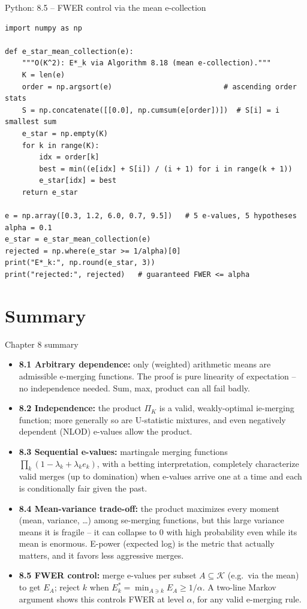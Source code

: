 \documentclass[aspectratio=169,10pt]{beamer}
\newcommand{\calK}{\mathcal{K}}
\begin{document}
\begin{frame}[fragile]{Python: 8.5 -- FWER control via the mean e-collection}
  \begin{lstlisting}
import numpy as np

def e_star_mean_collection(e):
    """O(K^2): E*_k via Algorithm 8.18 (mean e-collection)."""
    K = len(e)
    order = np.argsort(e)                          # ascending order stats
    S = np.concatenate([[0.0], np.cumsum(e[order])])  # S[i] = i smallest sum
    e_star = np.empty(K)
    for k in range(K):
        idx = order[k]
        best = min((e[idx] + S[i]) / (i + 1) for i in range(k + 1))
        e_star[idx] = best
    return e_star

e = np.array([0.3, 1.2, 6.0, 0.7, 9.5])   # 5 e-values, 5 hypotheses
alpha = 0.1
e_star = e_star_mean_collection(e)
rejected = np.where(e_star >= 1/alpha)[0]
print("E*_k:", np.round(e_star, 3))
print("rejected:", rejected)   # guaranteed FWER <= alpha
  \end{lstlisting}
\end{frame}

\section{Summary}

\begin{frame}{Chapter 8 summary}
  \begin{itemize}
    \item \textbf{8.1 Arbitrary dependence:} only (weighted) arithmetic means are admissible e-merging functions. The proof is pure linearity of expectation -- no independence needed. Sum, max, product can all fail badly.
    \item \textbf{8.2 Independence:} the product $\Pi_K$ is a valid, weakly-optimal ie-merging function; more generally so are U-statistic mixtures, and even negatively dependent (NLOD) e-values allow the product.
    \item \textbf{8.3 Sequential e-values:} martingale merging functions $\prod_k(1-\lambda_k+\lambda_k e_k)$, with a betting interpretation, completely characterize valid merges (up to domination) when e-values arrive one at a time and each is conditionally fair given the past.
    \item \textbf{8.4 Mean-variance trade-off:} the product maximizes every moment (mean, variance, \dots) among se-merging functions, but this large variance means it is fragile -- it can collapse to 0 with high probability even while its mean is enormous. E-power (expected log) is the metric that actually matters, and it favors less aggressive merges.
    \item \textbf{8.5 FWER control:} merge e-values per subset $A \subseteq \calK$ (e.g.\ via the mean) to get $E_A$; reject $k$ when $E_k^\ast = \min_{A\ni k} E_A \geq 1/\alpha$. A two-line Markov argument shows this controls FWER at level $\alpha$, for any valid e-merging rule.
  \end{itemize}
\end{frame}
\end{document}
